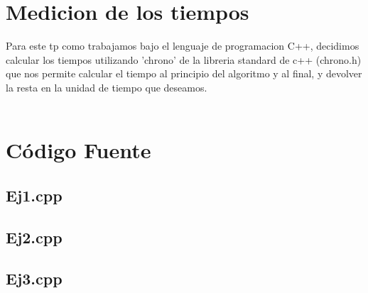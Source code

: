 \section{Medicion de los tiempos}

Para este tp como trabajamos bajo el lenguaje de programacion C++, decidimos calcular los tiempos utilizando 'chrono' de la libreria standard de c++ (chrono.h) que nos permite calcular el tiempo al principio del algoritmo y al final, y devolver la resta en la unidad de tiempo que deseamos.\\ \\


\section{C\'odigo Fuente}
\subsection{Ej1.cpp}


\newpage
\subsection{Ej2.cpp}


\newpage
\subsection{Ej3.cpp}


